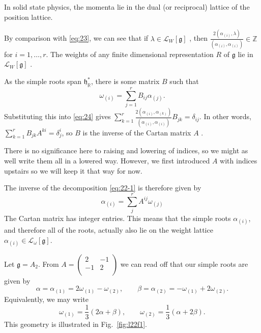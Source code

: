 \begin{example}[]
  In solid state physics, the momenta lie in the dual (or reciprocal) lattice of the position lattice.
\end{example}

By comparison with \eqref{eq:23}, we can see that if $\lambda \in \mathcal{L}_W[\mathfrak{g}]$ , then $\frac{2 (\alpha_{(i)}, \lambda)}{(\alpha_{(i)}, \alpha_{(i)})} \in \mathbb{Z}$ for $i = 1, \dots, r$.
The weights of any finite dimensional representation $R$ of $\mathfrak{g}$ lie in $\mathcal{L}_W[\mathfrak{g}]$ .


As the simple roots span $\mathfrak{h}^*_{\mathbb{R}}$, there is some matrix $B$ such that
\begin{equation}
  \label{eq:22-1}
  \omega_{(i)} = \sum_{j=1}^{r} B_{ij} \alpha_{(j)}.
\end{equation}
Substituting this into \eqref{eq:24} gives $\sum_{k=1}^{r} \frac{2(\alpha_{(i)}, \alpha_{(k)})}{(\alpha_{(i)}, \alpha_{(i)})} B_{jk} = \delta_{ij}$.
In other words, $\sum_{k=1}^{r} B_{jk} A^{ki} = \delta_{j}^{i}$, so $ B$ is the inverse of the Cartan matrix $A$ .
\begin{remark}
  There is no significance here to raising and lowering of indices, so we might as well write them all in a lowered way.
  However, we first introduced $A$ with indices upstairs so we will keep it that way for now.
\end{remark}
The inverse of the decomposition \eqref{eq:22-1} is therefore given by
\begin{equation}
  \boxed{\alpha_{(i)} = \sum_{j}^{r} A^{ij} \omega_{(j)}}
\end{equation}
The Cartan matrix has integer entries.
This means that the simple roots $\alpha_{(i)}$, and therefore all of the roots, actually also lie on the weight lattice $\alpha_{(i)} \in \mathcal{L}_{\omega} [\mathfrak{g}]$.

\begin{example}[]
  Let $\mathfrak{g} = A_2$. From $A = 
    \begin{pmatrix}
     2 & -1 \\
     -1 & 2 \\
    \end{pmatrix} $ we can read off that our simple roots are given by
  \begin{equation}
    \alpha = \alpha_{(1)} = 2 \omega_{(1)} - \omega_{(2)}, \qquad
    \beta = \alpha_{(2)} = -\omega_{(1)} + 2 \omega_{(2)}.
  \end{equation}
  Equivalently, we may write
  \begin{equation}
    \omega_{(1)} = \frac{1}{3} (2\alpha + \beta), \qquad 
    \omega_{(2)} = \frac{1}{3} (\alpha + 2\beta).
  \end{equation}
  This geometry is illustrated in Fig.~\ref{fig:l22f1}.
\end{example}

